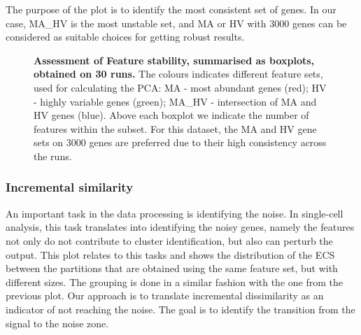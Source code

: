 The purpose of the plot is to identify the most consistent set of genes. In our case, MA\_HV is the most unstable set, and MA or HV with 3000 genes can be considered as suitable choices for getting robust results.
\begin{figure}[H]
    \centering
    \caption{\label{fig:ca-feat-inc} \textbf{Assessment of Feature stability, summarised as boxplots, obtained on 30 runs.} The colours indicates different feature sets, used for calculating the PCA: MA - most abundant genes (red); HV - highly variable genes (green); MA\_HV - intersection of MA and HV genes (blue). Above each boxplot we indicate the number of features within the subset. For this dataset, the MA and HV gene sets on 3000 genes are preferred due to their high consistency across the runs.}
\end{figure}

\subsubsection{Incremental similarity}
An important task in the data processing is identifying the noise. In single-cell analysis, this task translates into identifying the noisy genes, namely the features not only do not contribute to cluster identification, but also can perturb the output. This plot relates to this tasks and shows the distribution of the ECS between the partitions that are obtained using the same feature set, but with different sizes. The grouping is done in a similar fashion with the one from the previous plot. Our approach is to translate incremental dissimilarity as an indicator of not reaching the noise. The goal is to identify the transition from the signal to the noise zone.

